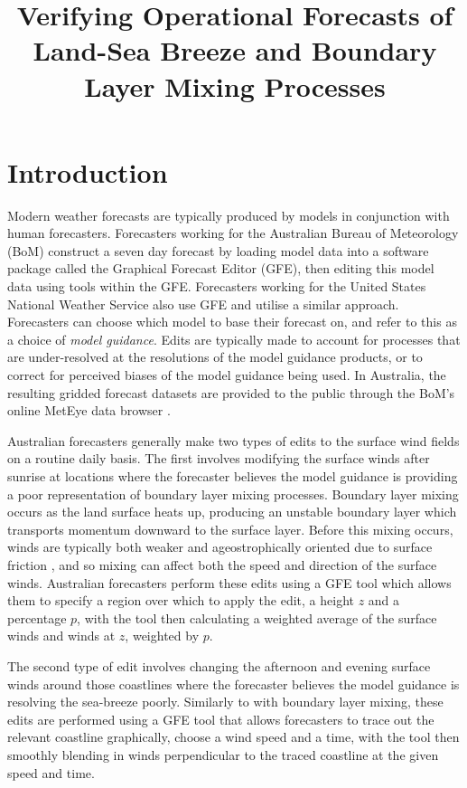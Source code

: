 \documentclass[twocol]{ametsoc}
\title{Verifying Operational Forecasts of Land-Sea Breeze and Boundary Layer Mixing Processes}
\affiliation{School of Earth Sciences, and ARC Centre of Excellence for Climate Extremes, The University of Melbourne, Melbourne, Victoria, Australia.}
\begin{document}
\maketitle

\section{Introduction}
\label{Sec:Introduction}
Modern weather forecasts are typically produced by models in conjunction with human forecasters. Forecasters working for the Australian Bureau of Meteorology (BoM) construct a seven day forecast by loading model data into a software package called the Graphical Forecast Editor (GFE), then editing this model data using tools within the GFE. Forecasters working for the United States National Weather Service also use GFE and utilise a similar approach. Forecasters can choose which model to base their forecast on, and refer to this as a choice of \textit{model guidance}. Edits are typically made to account for processes that are under-resolved at the resolutions of the model guidance products, or to correct for perceived biases of the model guidance being used. In Australia, the resulting gridded forecast datasets are provided to the public through the BoM's online MetEye data browser \citep{bomMetEye19}.

Australian forecasters generally make two types of edits to the surface wind fields on a routine daily basis. The first involves modifying the surface winds after sunrise at locations where the forecaster believes the model guidance is providing a poor representation of boundary layer mixing processes. Boundary layer mixing occurs as the land surface heats up, producing an unstable boundary layer which transports momentum downward to the surface layer. Before this mixing occurs, winds are typically both weaker and ageostrophically oriented due to surface friction \citep{lee18}, and so mixing can affect both the speed and direction of the surface winds. Australian forecasters perform these edits using a GFE tool which allows them to specify a region over which to apply the edit, a height $z$ and a percentage $p$, with the tool then calculating a weighted average of the surface winds and winds at $z$, weighted by $p$.

The second type of edit involves changing the afternoon and evening surface winds around those coastlines where the forecaster believes the model guidance is resolving the sea-breeze poorly. Similarly to with boundary layer mixing, these edits are performed using a GFE tool that allows forecasters to trace out the relevant coastline graphically, choose a wind speed and a time, with the tool then smoothly blending in winds perpendicular to the traced coastline at the given speed and time.
\end{document}
